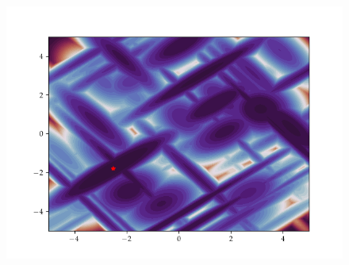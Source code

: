 \begin{figure}[h]
\begin{minipage}[b]{0.32\textwidth}
      \includegraphics[trim=2.5cm 1.3cm 2.5cm 1.3cm,clip,width=\textwidth]{Figures/coco/f21.png}
    \end{minipage}
    

\end{figure}
